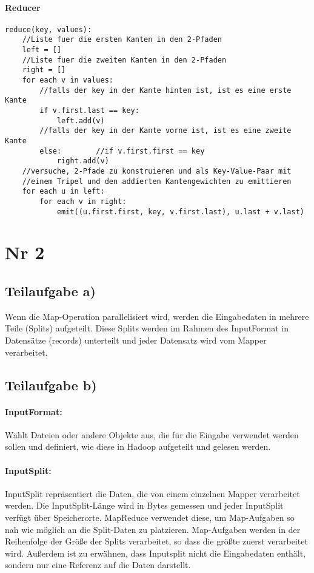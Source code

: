 \documentclass{article}
\begin{document}
\paragraph{Reducer}
\begin{lstlisting}
reduce(key, values):
	//Liste fuer die ersten Kanten in den 2-Pfaden
	left = []
	//Liste fuer die zweiten Kanten in den 2-Pfaden
	right = []
	for each v in values:
		//falls der key in der Kante hinten ist, ist es eine erste Kante
		if v.first.last == key:
			left.add(v)
		//falls der key in der Kante vorne ist, ist es eine zweite Kante
		else:        //if v.first.first == key
			right.add(v)
	//versuche, 2-Pfade zu konstruieren und als Key-Value-Paar mit
	//einem Tripel und den addierten Kantengewichten zu emittieren
	for each u in left:
		for each v in right:
			emit((u.first.first, key, v.first.last), u.last + v.last)
\end{lstlisting}


\section{Nr 2}

\subsection{Teilaufgabe a)}
Wenn die Map-Operation parallelisiert wird, werden die Eingabedaten in mehrere Teile (Splits) aufgeteilt.
Diese Splits werden im Rahmen des InputFormat in Datensätze (records) unterteilt und jeder Datensatz wird vom Mapper verarbeitet.

\subsection{Teilaufgabe b)}

\paragraph{InputFormat:}
Wählt Dateien oder andere Objekte aus, die für die Eingabe verwendet werden sollen und definiert, wie diese in Hadoop aufgeteilt und gelesen werden.

\paragraph{InputSplit:}
InputSplit repräsentiert die Daten, die von einem einzelnen Mapper verarbeitet werden. Die InputSplit-Länge wird in Bytes gemessen und jeder InputSplit verfügt über Speicherorte. MapReduce verwendet diese, um Map-Aufgaben so nah wie möglich an die Split-Daten zu platzieren. Map-Aufgaben werden in der Reihenfolge der Größe der Splits verarbeitet, so dass die größte zuerst verarbeitet wird. Außerdem ist zu erwähnen, dass Inputsplit nicht die Eingabedaten enthält, sondern nur eine Referenz auf die Daten darstellt.
\end{document}
